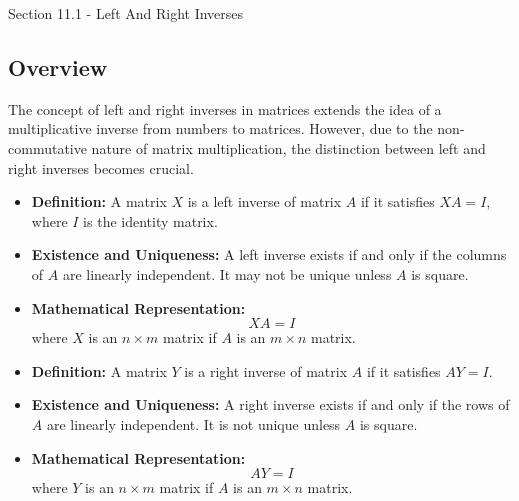 \begin{notes}{Section 11.1 - Left And Right Inverses}
    \subsection*{Overview}

    The concept of left and right inverses in matrices extends the idea of a multiplicative inverse from numbers to matrices. However, due to the non-commutative nature of matrix multiplication, the 
    distinction between left and right inverses becomes crucial. \vspace*{1em}

    \begin{Highlight}
        \begin{itemize}
            \item \textbf{Definition:} A matrix $X$ is a left inverse of matrix $A$ if it satisfies $XA = I$, where $I$ is the identity matrix.
            \item \textbf{Existence and Uniqueness:} A left inverse exists if and only if the columns of $A$ are linearly independent. It may not be unique unless $A$ is square.
            \item \textbf{Mathematical Representation:}
            \begin{equation*}
                XA = I
            \end{equation*}
            where $X$ is an $n \times m$ matrix if $A$ is an $m \times n$ matrix.
        \end{itemize}
    \end{Highlight}

    \begin{Highlight}
        \begin{itemize}
            \item \textbf{Definition:} A matrix $Y$ is a right inverse of matrix $A$ if it satisfies $AY = I$.
            \item \textbf{Existence and Uniqueness:} A right inverse exists if and only if the rows of $A$ are linearly independent. It is not unique unless $A$ is square.
            \item \textbf{Mathematical Representation:} 
            \begin{equation*}
                AY = I
            \end{equation*}
            where $Y$ is an $n \times m$ matrix if $A$ is an $m \times n$ matrix.
        \end{itemize}
    \end{Highlight}


\end{notes}
